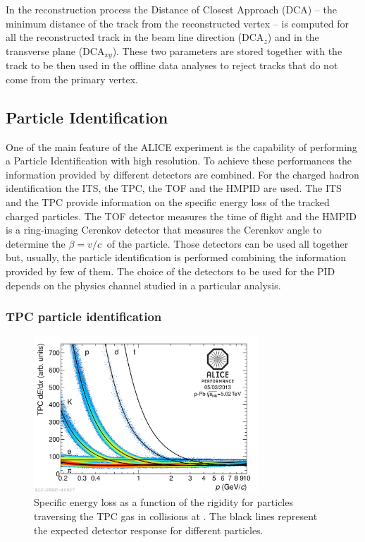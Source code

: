 In the reconstruction process the Distance of Closest Approach (DCA) -- the minimum 
distance of the track from the reconstructed vertex -- is computed for all the reconstructed
track in the beam line direction (DCA$_{z}$) and in the transverse plane (DCA$_{xy}$).
These two parameters are stored together with the track to be then used in the offline data analyses
to reject tracks that do not come from the primary vertex.

%
\subsection{Particle Identification} \label{sec:PID}

One of the main feature of the ALICE experiment is the capability of performing a Particle
Identification with high resolution.
To achieve these performances the information provided by different detectors are combined.
For the charged hadron identification the ITS, the TPC, the TOF and the HMPID are used.
The ITS and the TPC provide information on the specific energy loss of the tracked charged particles.
The TOF detector measures the time of flight and the HMPID is a ring-imaging Cerenkov detector that
measures the Cerenkov angle to determine the $\beta = v / c\ $ of the particle.
Those detectors can be used all together but, usually, the particle identification is performed
combining the information provided by few of them.
The choice of the detectors to be used for the PID depends on the physics channel studied in a
particular analysis.

\subsubsection{TPC particle identification} \label{sec:TPC_PID}

\begin{figure} 
    \centering
    \includegraphics[width=0.75\textwidth]{gfx/pid_tpc_gen}
	\caption{Specific energy loss as a function of the rigidity for particles traversing the TPC gas in \pPb collisions at \sctev. The black lines represent the expected detector response for different particles.}
	\label{fig:pid_tpc}
\end{figure}

